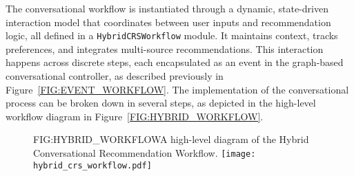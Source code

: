 The conversational workflow is instantiated through a dynamic, state-driven interaction model that coordinates between user inputs and recommendation logic, all defined in a \texttt{HybridCRSWorkflow} module. It maintains context, tracks preferences, and integrates multi-source recommendations. This interaction happens across discrete steps, each encapsulated as an event in the graph-based conversational controller, as described previously in Figure~\ref{FIG:EVENT_WORKFLOW}. The implementation of the conversational process can be broken down in several steps, as depicted in the high-level workflow diagram in Figure~\ref{FIG:HYBRID_WORKFLOW}.

\begin{figure}[High-Level Conversational Workflow]{FIG:HYBRID_WORKFLOW}{A high-level diagram of the Hybrid Conversational Recommendation Workflow.}
    \texttt{[image: hybrid\_crs\_workflow.pdf]}
\end{figure}


